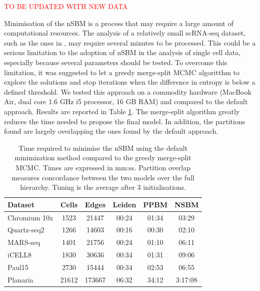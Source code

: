 \documentclass[10pt]{article}
\begin{document}
\textcolor{red}{TO BE UPDATED WITH NEW DATA}

Minimisation of the nSBM is a process that may require a large amount of computational resources. The analysis of a relatively small scRNA-seq dataset, such as the ones in \cite{mereu_2020}, may require several minutes to be processed. This could be a serious limitation to the adoption of nSBM in the analysis of single cell data, especially because several parameters should be tested. To overcome this limitation, it was suggested to let a greedy merge-split MCMC algoritthm \cite{peixoto_2020} to explore the solutions and stop iterations when the difference in entropy is below a defined threshold. We tested this approach on a commodity hardware (MacBook Air, dual core 1.6 GHz i5 processor, 16 GB RAM) and compared to the default approach. Results are reported in Table \ref{Table1}. The merge-split algorithm greatly reduces the time needed to propose the final model. In addition, the partitions found are largely overlapping the ones found by the default approach. 

\begin{table}[h!]
\centering
 \begin{tabular}{|| l c c c c c ||}
 \hline
 \textbf{Dataset} & \textbf{Cells} & \textbf{Edges} & \textbf{Leiden} & \textbf{PPBM} & \textbf{NSBM} \\ [0.5ex] 
 \hline\hline
 Chromium 10x \cite{mereu_2020} & 1523 & 21447 & 00:24 & 01:34 & 03:29\\ 
 \hline
 Quartz-seq2 \cite{mereu_2020} & 1266 & 14603 & 00:16 & 00:30 & 02:10 \\
 \hline
 MARS-seq \cite{mereu_2020} & 1401 & 21756 & 00:24 & 01:10 & 06:11 \\
 \hline
 iCELL8 \cite{mereu_2020} & 1830 & 30636 & 00:34 & 01:31 & 09:06 \\
 \hline
 Paul15 \cite{paul_2015} & 2730 & 15444 & 00:34 & 02:53 & 06:55\\ 
 \hline
 Planaria \cite{plass_2018} & 21612 & 173667 & 06:32 & 34:12 & 3:17:08 \\
 \hline
\end{tabular}
\caption{Time required to minimise the nSBM using the default minimization method compared to the greedy merge-split MCMC. Times are expressed in mm:ss. Partition overlap measures concordance between the two models over the full hierarchy. Timing is the average after 3 initialisations.}
\label{Table1}
\end{table}
\end{document}
